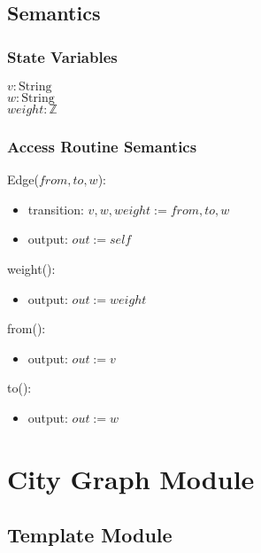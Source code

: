 \documentclass[12pt]{article}
\begin{document}
\newpage

\subsection* {Semantics}

\subsubsection* {State Variables}

$\mathit{v}: \text{String}$\\
$\mathit{w}: \text{String}$\\
$\mathit{weight}: \mathbb{Z}$

\subsubsection* {Access Routine Semantics}

Edge($from, to, w$):
\begin{itemize}
\item transition: $v, w, weight := from, to, w$ 

\item output: $\mathit{out} := \mathit{self}$
\end{itemize}


\noindent weight():
\begin{itemize}
\item output: $\mathit{out} := weight$
\end{itemize}

\noindent from():
\begin{itemize}
\item output: $\mathit{out} := v$
\end{itemize}

\noindent to():
\begin{itemize}
\item output: $\mathit{out} := w$
\end{itemize}




\newpage

\section* {City Graph Module}

\subsection* {Template Module}
\end{document}
